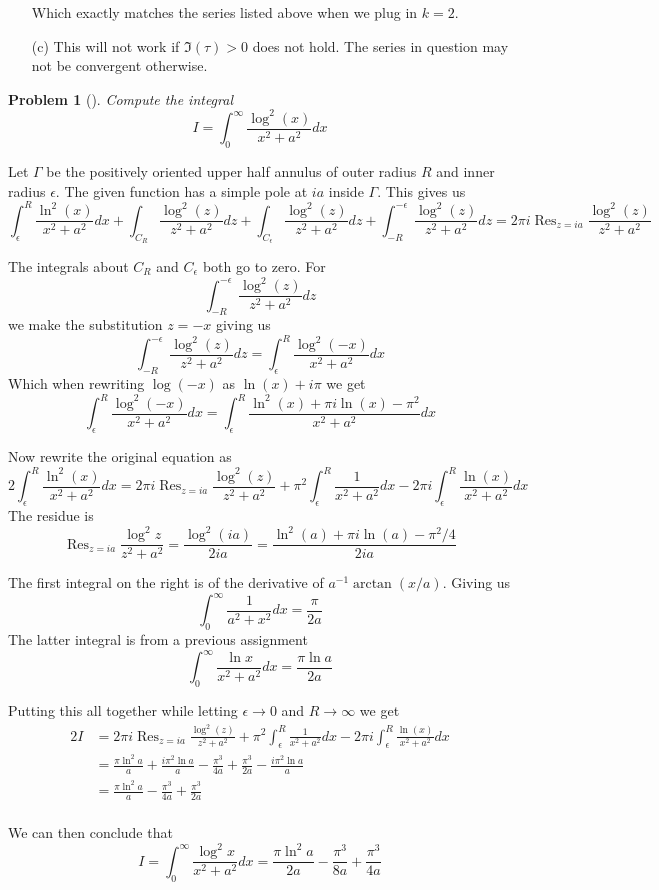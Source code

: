 \documentclass[10pt]{article}
\newcommand{\sk}{\vskip 10mm}
\DeclareMathOperator{\res}{Res}
\theoremstyle{plain}
\newtheorem{problem}{Problem}
\theoremstyle{remark}
\begin{document}
\begin{enumerate}
  Which exactly matches the series listed above when we plug in $k=2$.
\item[(c)] This will not work if $\Im(\tau)>0$ does not hold. The series in
  question may not be convergent otherwise.
\end{enumerate}

\sk

\begin{problem}[]
  Compute the integral 
  \[
    I = \int_0^\infty \frac{\log^2(x)}{x^2 + a^2} dx
  \]
\end{problem}

Let $\Gamma$ be the positively oriented upper half annulus of outer radius $R$
and inner radius $\epsilon$. The given function has a simple pole at $ia$ inside $\Gamma$.
This gives us
\[
  \int_\epsilon^R\frac{\ln^2(x)}{x^2 + a^2} dx + \int_{C_R}\frac{\log^2(z)}{z^2 + a^2} dz+ \int_{C_\epsilon}\frac{\log^2(z)}{z^2 + a^2} dz+\int_{-R}^{-\epsilon}\frac{\log^2(z)}{z^2 + a^2} dz=2\pi i\res_{z=ia}\frac{\log^2(z)}{z^2 + a^2}
\]

The integrals about $C_R$ and $C_\epsilon$ both go to zero. For
\[
  \int_{-R}^{-\epsilon}\frac{\log^2(z)}{z^2 + a^2} dz
\]
we make the substitution $z=-x$ giving us
\[
  \int_{-R}^{-\epsilon}\frac{\log^2(z)}{z^2 + a^2} dz = \int_{\epsilon}^R\frac{\log^2(-x)}{x^2 + a^2} dx
\]
Which when rewriting $\log(-x)$ as $\ln(x)+i\pi$ we get
\[
  \int_{\epsilon}^R\frac{\log^2(-x)}{x^2 + a^2} dx = \int_{\epsilon}^R\frac{\ln^2(x)+\pi i\ln(x)-\pi^2}{x^2 + a^2} dx
\]

Now rewrite the original equation as
\[
  2\int_\epsilon^R\frac{\ln^2(x)}{x^2+a^2}dx = 2\pi i\res_{z=ia}\frac{\log^2(z)}{z^2 + a^2} +\pi^2\int_\epsilon^R\frac{1}{x^2+a^2}dx-2\pi i\int_\epsilon^R\frac{\ln(x)}{x^2+a^2}dx
\]
The residue is
\[
  \res_{z=ia}\frac{\log^2z}{z^2+a^2}=\frac{\log^2(ia)}{2ia}=\frac{\ln^2(a)+\pi i\ln(a)-\pi^2/4}{2ia}
\]

The first integral on the right is of the derivative of $a^{-1}\arctan(x/a)$. Giving us
\[
  \int_0^\infty\frac{1}{a^2+x^2}dx=\frac{\pi}{2a}
\]
The latter integral is from a previous assignment
\[
  \int_0^\infty\frac{\ln x}{x^2+a^2}dx = \frac{\pi\ln a}{2a}
\]

Putting this all together while letting $\epsilon\rightarrow 0$ and $R\rightarrow\infty$ we get
\begin{align*}
  2I &= 2\pi i\res_{z=ia}\frac{\log^2(z)}{z^2 + a^2} +\pi^2\int_\epsilon^R\frac{1}{x^2+a^2}dx-2\pi i\int_\epsilon^R\frac{\ln(x)}{x^2+a^2}dx\\
     &=\frac{\pi\ln^2 a}{a}+\frac{i\pi^2\ln a}{a}-\frac{\pi^3}{4a}+\frac{\pi^3}{2a}-\frac{i\pi^2\ln a}{a}\\
     &=\frac{\pi\ln^2 a}{a}-\frac{\pi^3}{4a}+\frac{\pi^3}{2a}\\
\end{align*}

We can then conclude that
\[
  I = \int_0^\infty \frac{\log^2 x}{x^2+a^2} dx = \frac{\pi\ln^2 a}{2a}-\frac{\pi^3}{8a}+\frac{\pi^3}{4a}
\]

\end{document}
